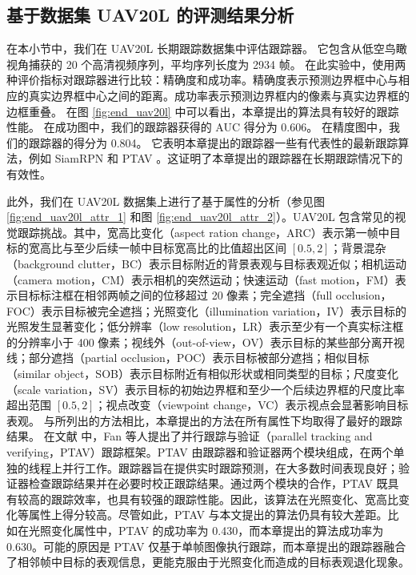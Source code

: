 \subsection{基于数据集 UAV20L 的评测结果分析}
在本小节中，我们在 UAV20L \cite{mueller2016benchmark} 长期跟踪数据集中评估跟踪器。
它包含从低空鸟瞰视角捕获的 20 个高清视频序列，平均序列长度为 2934 帧。
在此实验中，使用两种评价指标对跟踪器进行比较：精确度和成功率。精确度表示预测边界框中心与相应的真实边界框中心之间的距离。成功率表示预测边界框内的像素与真实边界框的边框重叠。
在图 \ref{fig:end_uav20l} 中可以看出，本章提出的算法具有较好的跟踪性能。
在成功图中，我们的跟踪器获得的 AUC 得分为 0.606。
在精度图中，我们的跟踪器的得分为 0.804。
它表明本章提出的跟踪器一些有代表性的最新跟踪算法，例如 SiamRPN \cite{SiamRPN} 和 PTAV \cite{fan2018parallel}。这证明了本章提出的跟踪器在长期跟踪情况下的有效性。

此外，我们在 UAV20L 数据集上进行了基于属性的分析（参见图 \ref{fig:end_uav20l_attr_1} 和图 \ref{fig:end_uav20l_attr_2}）。UAV20L 包含常见的视觉跟踪挑战。其中，宽高比变化（aspect ration change，ARC）表示第一帧中目标的宽高比与至少后续一帧中目标宽高比的比值超出区间 $[0.5, 2]$；背景混杂（background clutter，BC）表示目标附近的背景表观与目标表观近似；相机运动（camera motion，CM）表示相机的突然运动；快速运动（fast motion，FM）表示目标标注框在相邻两帧之间的位移超过 20 像素；完全遮挡（full occlusion，FOC）表示目标被完全遮挡；光照变化（illumination variation，IV）表示目标的光照发生显著变化；低分辨率（low resolution，LR）表示至少有一个真实标注框的分辨率小于 400 像素；视线外（out-of-view，OV）表示目标的某些部分离开视线；部分遮挡（partial occlusion，POC）表示目标被部分遮挡；相似目标（similar object，SOB）表示目标附近有相似形状或相同类型的目标；尺度变化（scale variation，SV）表示目标的初始边界框和至少一个后续边界框的尺度比率超出范围 $[0.5, 2]$；视点改变（viewpoint change，VC）表示视点会显著影响目标表观。
与所列出的方法相比，本章提出的方法在所有属性下均取得了最好的跟踪结果。
在文献 \cite{fan2018parallel} 中，Fan 等人提出了并行跟踪与验证（parallel tracking and verifying，PTAV）跟踪框架。PTAV 由跟踪器和验证器两个模块组成，在两个单独的线程上并行工作。跟踪器旨在提供实时跟踪预测，在大多数时间表现良好；验证器检查跟踪结果并在必要时校正跟踪结果。通过两个模块的合作，PTAV 既具有较高的跟踪效率，也具有较强的跟踪性能。因此，该算法在光照变化、宽高比变化等属性上得分较高。尽管如此，PTAV 与本文提出的算法仍具有较大差距。比如在光照变化属性中，PTAV 的成功率为 0.430，而本章提出的算法成功率为 0.630。可能的原因是 PTAV 仅基于单帧图像执行跟踪，而本章提出的跟踪器融合了相邻帧中目标的表观信息，更能克服由于光照变化而造成的目标表观退化现象。

